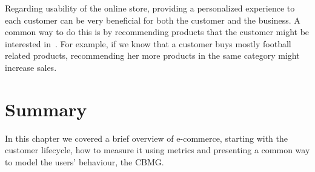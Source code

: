 Regarding usability of the online store, providing a personalized experience to 
each customer can be very beneficial for both the customer and the business. A 
common way to do this is by recommending products that the customer might be 
interested in~\cite{Adomavicius2005}. For example, if we know that a customer 
buys mostly football related products, recommending her more products in the 
same category might increase sales.

\section{Summary}

In this chapter we covered a brief overview of e-commerce, starting with the 
customer lifecycle, how to measure it using metrics and presenting a common way 
to model the users' behaviour, the CBMG.

